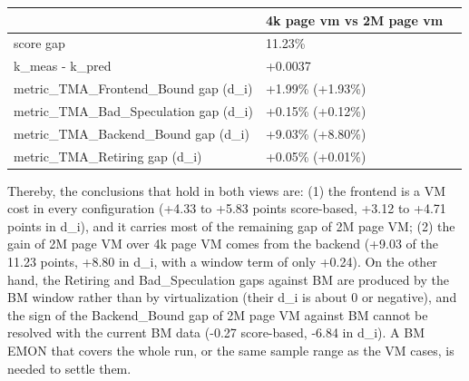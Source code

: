 \documentclass[12pt]{article}
\newcommand{\npar}[1]{#1\par}
\newcommand{\emptypar}{\mbox{}\par}
\begin{document}
\noindent\hspace*{26.75pt}\begin{tabular}{|b{191.20pt}|b{139.20pt}|@{}b{0pt}@{}}
\hline
\centering\arraybackslash{} & \centering\arraybackslash{}4k page vm vs 2M page vm & \rule[-0.00pt]{0pt}{12.25pt} \\ \hline
\centering\arraybackslash{}score gap & \centering\arraybackslash{}11.23\% & \rule[-0.00pt]{0pt}{12.25pt} \\ \hline
\centering\arraybackslash{}k\_\allowbreak{}meas - k\_\allowbreak{}pred & \centering\arraybackslash{}+0.0037 & \rule[-0.00pt]{0pt}{12.25pt} \\ \hline
\cellcolor[HTML]{F8CBAD}\centering\arraybackslash{}metric\_\allowbreak{}TMA\_\allowbreak{}Frontend\_\allowbreak{}Bound gap (d\_\allowbreak{}i) & \cellcolor[HTML]{F8CBAD}\centering\arraybackslash{}+1.99\% (+1.93\%) & \rule[-0.00pt]{0pt}{12.25pt} \\ \hline
\centering\arraybackslash{}metric\_\allowbreak{}TMA\_\allowbreak{}Bad\_\allowbreak{}Speculation gap (d\_\allowbreak{}i) & \centering\arraybackslash{}+0.15\% (+0.12\%) & \rule[-0.00pt]{0pt}{12.25pt} \\ \hline
\cellcolor[HTML]{F8CBAD}\centering\arraybackslash{}metric\_\allowbreak{}TMA\_\allowbreak{}Backend\_\allowbreak{}Bound gap (d\_\allowbreak{}i) & \cellcolor[HTML]{F8CBAD}\centering\arraybackslash{}+9.03\% (+8.80\%) & \rule[-0.00pt]{0pt}{12.25pt} \\ \hline
\centering\arraybackslash{}metric\_\allowbreak{}TMA\_\allowbreak{}Retiring gap (d\_\allowbreak{}i) & \centering\arraybackslash{}+0.05\% (+0.01\%) & \rule[-0.00pt]{0pt}{12.25pt} \\ \hline
\end{tabular}\par\endgroup\par
\emptypar
\npar{\hspace*{9.75pt}Thereby, the conclusions that hold in both views are: (1) the frontend is a VM cost in every configuration (+4.33 to +5.83 points score-based, +3.12 to +4.71 points in d\_i), and it carries most of the remaining gap of 2M page VM; (2) the gain of 2M page VM over 4k page VM comes from the backend (+9.03 of the 11.23 points, +8.80 in d\_i, with a window term of only +0.24). On the other hand, the Retiring and Bad\_Speculation gaps against BM are produced by the BM window rather than by virtualization (their d\_i is about 0 or negative), and the sign of the Backend\_Bound gap of 2M page VM against BM cannot be resolved with the current BM data (-0.27 score-based, -6.84 in d\_i). A BM EMON that covers the whole run, or the same sample range as the VM cases, is needed to settle them.}
\end{document}
